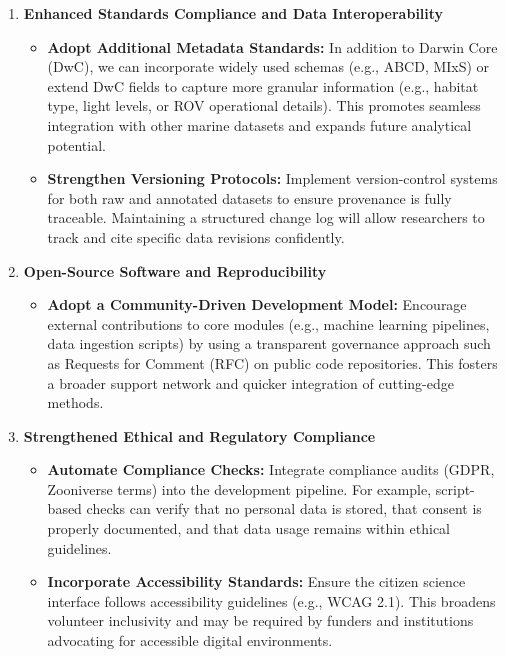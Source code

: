 \begin{enumerate}
    \item \textbf{Enhanced Standards Compliance and Data Interoperability}
      \begin{itemize}
        \item \textbf{Adopt Additional Metadata Standards:} In addition to Darwin Core (DwC), we can incorporate widely used schemas (e.g., ABCD, MIxS) or extend DwC fields to capture more granular information (e.g., habitat type, light levels, or ROV operational details). This promotes seamless integration with other marine datasets and expands future analytical potential.
        \item \textbf{Strengthen Versioning Protocols:} Implement version-control systems for both raw and annotated datasets to ensure provenance is fully traceable. Maintaining a structured change log will allow researchers to track and cite specific data revisions confidently.
      \end{itemize}
  
    \item \textbf{Open-Source Software and Reproducibility}
      \begin{itemize}
        \item \textbf{Adopt a Community-Driven Development Model:} Encourage external contributions to core modules (e.g., machine learning pipelines, data ingestion scripts) by using a transparent governance approach such as Requests for Comment (RFC) on public code repositories. This fosters a broader support network and quicker integration of cutting-edge methods.
      \end{itemize}
  
    \item \textbf{Strengthened Ethical and Regulatory Compliance}
      \begin{itemize}
        \item \textbf{Automate Compliance Checks:} Integrate compliance audits (GDPR, Zooniverse terms) into the development pipeline. For example, script-based checks can verify that no personal data is stored, that consent is properly documented, and that data usage remains within ethical guidelines.
        \item \textbf{Incorporate Accessibility Standards:} Ensure the citizen science interface follows accessibility guidelines (e.g., WCAG 2.1). This broadens volunteer inclusivity and may be required by funders and institutions advocating for accessible digital environments.
      \end{itemize}
  

\end{enumerate}
